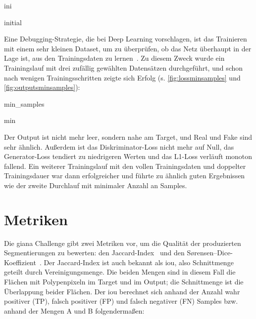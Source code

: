 \begin{losseswoiou}{ini}
	\caption{Verläufe des initialen Trainingslaufs (x: Trainingsschritt, y: Wert).}
	\label{fig:lossini}
\end{losseswoiou}

\begin{outputs}{initial}
	\caption{Initialer Trainingslauf: ein Datensatz und die dazugehörige Ausgabe des Netzes.}
	\label{fig:outputsini}
\end{outputs}

Eine Debugging-Strategie, die \citeauthor{Goodfellow.2016} bei Deep Learning vorschlagen, ist das Trainieren mit einem sehr kleinen Dataset, um zu überprüfen, ob das Netz überhaupt in der Lage ist, aus den Trainingsdaten zu lernen~\cite{Goodfellow.2016}.
Zu diesem Zweck wurde ein Trainingslauf mit drei zufällig gewählten Datensätzen durchgeführt, und schon nach wenigen Trainingsschritten zeigte sich Erfolg (s. \autoref{fig:lossminsamples} und \autoref{fig:outputsminsamples}):

\begin{losseswoiou}{min_samples}
	\caption{Verläufe des Durchlaufs mit minimaler Anzahl Samples.}
	\label{fig:lossminsamples}
\end{losseswoiou}

\begin{outputs}{min}
	\caption{Datensatz und Ausgabe des Durchlaufs mit minimaler Anzahl Samples.}
	\label{fig:outputsminsamples}
\end{outputs}

Der Output ist nicht mehr leer, sondern nahe am Target, und Real und Fake sind sehr ähnlich.
Außerdem ist das Diskriminator-Loss nicht mehr auf Null, das Generator-Loss tendiert zu niedrigeren Werten und das L1-Loss verläuft monoton fallend.
Ein weiterer Trainingslauf mit den vollen Trainingsdaten und doppelter Trainingsdauer war dann erfolgreicher und führte zu ähnlich guten Ergebnissen wie der zweite Durchlauf mit minimaler Anzahl an Samples.



\section{Metriken}

Die \gls{giana} Challenge gibt zwei Metriken vor, um die Qualität der produzierten Segmentierungen zu bewerten: den Jaccard-Index~\cite{Jaccard.1901} und den Sørensen–Dice-Koeffizient~\cite{Srensen.1948,Dice.1945}.
Der Jaccard-Index ist auch bekannt als \gls{iou}, also Schnittmenge geteilt durch Vereinigungsmenge.
Die beiden Mengen sind in diesem Fall die Flächen mit Polypenpixeln im Target und im Output; die Schnittmenge ist die Überlappung beider Flächen.
Der \gls{iou} berechnet sich anhand der Anzahl wahr positiver (TP), falsch positiver (FP) und falsch negativer (FN) Samples bzw. anhand der Mengen A und B folgendermaßen:


